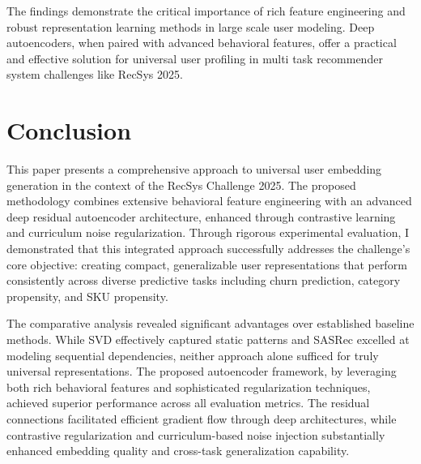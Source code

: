 \documentclass[sigconf]{acmart}
\begin{document}
The findings demonstrate the critical importance of rich feature engineering and robust representation learning methods in large scale user modeling. Deep autoencoders, when paired with advanced behavioral features, offer a practical and effective solution for universal user profiling in multi task recommender system challenges like RecSys 2025.
\label{sec:experiments}
\begin{table}[htb!]
\centering
	\caption{Performance comparison (AUROC) across open and hidden tasks.}
	\label{tab:results}
	\end{table}

\section{Conclusion}
This paper presents a comprehensive approach to universal user embedding generation in the context of the RecSys Challenge 2025. The proposed methodology combines extensive behavioral feature engineering with an advanced deep residual autoencoder architecture, enhanced through contrastive learning and curriculum noise regularization. Through rigorous experimental evaluation, I demonstrated that this integrated approach successfully addresses the challenge's core objective: creating compact, generalizable user representations that perform consistently across diverse predictive tasks including churn prediction, category propensity, and SKU propensity.

The comparative analysis revealed significant advantages over established baseline methods. While SVD effectively captured static patterns and SASRec excelled at modeling sequential dependencies, neither approach alone sufficed for truly universal representations. The proposed autoencoder framework, by leveraging both rich behavioral features and sophisticated regularization techniques, achieved superior performance across all evaluation metrics. The residual connections facilitated efficient gradient flow through deep architectures, while contrastive regularization and curriculum-based noise injection substantially enhanced embedding quality and cross-task generalization capability.
\end{document}
